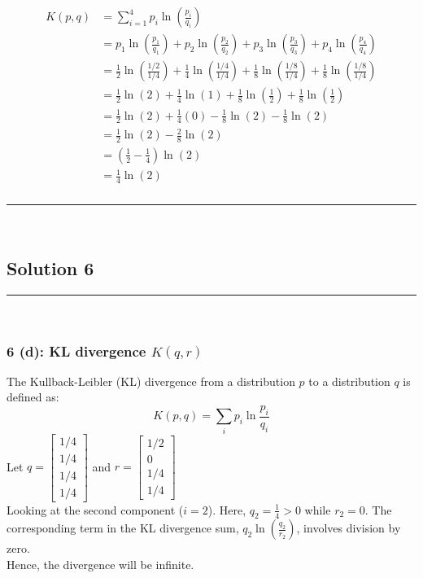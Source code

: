 \documentclass{article}
\begin{document}
\begin{align*}
K(p, q) &= \sum_{i=1}^{4} p_i \ln\left(\frac{p_i}{q_i}\right) \\
&= p_1 \ln\left(\frac{p_1}{q_1}\right) + p_2 \ln\left(\frac{p_2}{q_2}\right) + p_3 \ln\left(\frac{p_3}{q_3}\right) + p_4 \ln\left(\frac{p_4}{q_4}\right) \\
&= \frac{1}{2}\ln\left(\frac{1/2}{1/4}\right) + \frac{1}{4}\ln\left(\frac{1/4}{1/4}\right) + \frac{1}{8}\ln\left(\frac{1/8}{1/4}\right) + \frac{1}{8}\ln\left(\frac{1/8}{1/4}\right) \\
&= \frac{1}{2}\ln(2) + \frac{1}{4}\ln(1) + \frac{1}{8}\ln\left(\frac{1}{2}\right) + \frac{1}{8}\ln\left(\frac{1}{2}\right) \\
&= \frac{1}{2}\ln(2) + \frac{1}{4}(0) - \frac{1}{8}\ln(2) - \frac{1}{8}\ln(2) \\
&= \frac{1}{2}\ln(2) - \frac{2}{8}\ln(2) \\
&= \left(\frac{1}{2} - \frac{1}{4}\right)\ln(2) \\
&= \frac{1}{4}\ln(2)
\end{align*}

\subsubsection*{}
\noindent\rule{\textwidth}{0.4pt}\\

\newpage

\subsection*{Solution 6}
\noindent\rule{\textwidth}{0.4pt}\\

\subsubsection*{6 (d): KL divergence $K(q, r)$}
\parbox{\textwidth}{
The Kullback-Leibler (KL) divergence from a distribution $p$ to a distribution $q$ is defined as:
$$K(p, q) = \sum_{i} p_i \ln \frac{p_i}{q_i}$$
Let $q = \begin{bmatrix} 1/4 \\ 1/4 \\ 1/4 \\ 1/4 \end{bmatrix}$ and $r = \begin{bmatrix} 1/2 \\ 0 \\ 1/4 \\ 1/4 \end{bmatrix}$ \\

Looking at the second component ($i=2$). Here, $q_2 = \frac{1}{4} > 0$ while $r_2 = 0$. The corresponding term in the KL divergence sum, $q_2 \ln\left(\frac{q_2}{r_2}\right)$, involves division by zero. \\

Hence, the divergence will be infinite.
}
\end{document}
